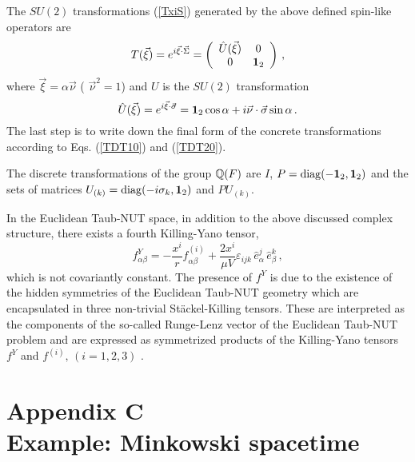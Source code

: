 \documentclass[a4paper,12pt]{article}
\begin{document}
The $SU(2)$ transformations (\ref{TxiS})  
generated  by the above defined spin-like operators are 
\begin{equation}\label{Uxi}
T(\vec{\xi})=e^{i\vec{\xi}\cdot \vec{\Sigma}}=\left(
\begin{array}{cc}
\hat U(\vec{\xi})&0\\
0&{\bf 1}_2
\end{array}\right)\,,
\end{equation}
where $\vec{\xi}=\alpha \vec{\nu}$ ( $\vec{\nu}^2=1$) and $U$ is the $SU(2)$ 
transformation 
\begin{equation}\label{SU2} 
\hat U(\vec{\xi})=e^{i\vec{\xi}\cdot\vec{\sigma}}=
{\bf 1}_2 \cos\alpha +i\vec{\nu}\cdot\vec{\sigma}\sin\alpha\,.
\end{equation}
The last step is to write down the final form of the concrete 
transformations according to Eqs. (\ref{TDT10}) and (\ref{TDT20}).


The discrete transformations of the group ${\Bbb Q}(F)$ are 
$I$,  $P={\rm diag}(-{\bf 1}_2,{\bf 1}_2)$ and the  sets of matrices  
$U_{(k)}={\rm diag} (-i\sigma_{k},{\bf 1}_2)$ and $PU_{(k)}$. 


In the Euclidean Taub-NUT space, in addition to the above discussed 
complex structure, there exists a fourth 
Killing-Yano tensor,  
\begin{equation}\label{fy}
f^Y_{\alpha\beta} 
= - \frac{x^i}{r}f^{(i)}_{\alpha\beta} +\frac{2 x^i}{\mu V}\varepsilon_{ijk} 
\,{\hat e}^j_{\alpha} 
\,{\hat e}^k_{\beta}\,,
\end{equation}
which is not covariantly constant. The presence of $f^Y$ is due to the 
existence of the hidden symmetries of the Euclidean Taub-NUT geometry which are 
encapsulated in three non-trivial St\"ackel-Killing tensors. These 
are interpreted as the components of the so-called Runge-Lenz vector of 
the Euclidean Taub-NUT problem and are expressed as symmetrized products of
the Killing-Yano tensors $f^Y$ and $f^{(i)},\, (i=1,2,3)$ \cite{CV}. 


\setcounter{equation}{0} \renewcommand{\theequation}
{C.\arabic{equation}}

\section*{Appendix C\\Example: Minkowski spacetime}
\end{document}
